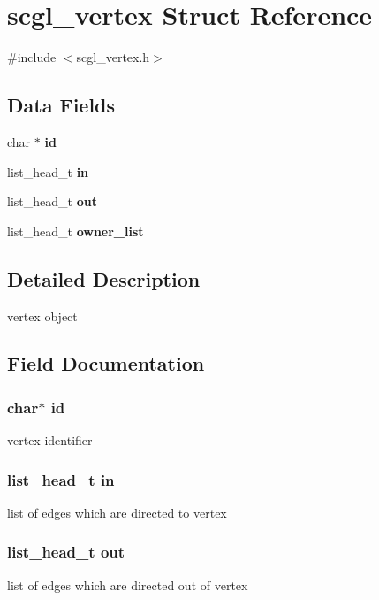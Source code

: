 \section{scgl\-\_\-vertex Struct Reference}
\label{structscgl__vertex}


{\ttfamily \#include $<$scgl\-\_\-vertex.\-h$>$}

\subsection*{Data Fields}
\begin{DoxyCompactItemize}
\item 
char $\ast$ {\bf id}
\item 
list\-\_\-head\-\_\-t {\bf in}
\item 
list\-\_\-head\-\_\-t {\bf out}
\item 
list\-\_\-head\-\_\-t {\bf owner\-\_\-list}
\end{DoxyCompactItemize}


\subsection{Detailed Description}
vertex object 

\subsection{Field Documentation}
\subsubsection[{id}]{\setlength{\rightskip}{0pt plus 5cm}char$\ast$ {\bf id}}\label{structscgl__vertex_aecb3b0d045ada529257a2fbf8f829599}
vertex identifier 
\subsubsection[{in}]{\setlength{\rightskip}{0pt plus 5cm}list\-\_\-head\-\_\-t {\bf in}}\label{structscgl__vertex_a3d3ac2f2ff7304c654a6efda253150f8}
list of edges which are directed to vertex 
\subsubsection[{out}]{\setlength{\rightskip}{0pt plus 5cm}list\-\_\-head\-\_\-t {\bf out}}\label{structscgl__vertex_aafefec4eef19815c5105c63e71cee418}
list of edges which are directed out of vertex 
